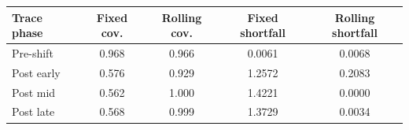 \begin{tabular}{lcccc}
\hline
Trace phase & Fixed cov. & Rolling cov. & Fixed shortfall & Rolling shortfall \\
\hline
Pre-shift & 0.968 & 0.966 & 0.0061 & 0.0068 \\
Post early & 0.576 & 0.929 & 1.2572 & 0.2083 \\
Post mid & 0.562 & 1.000 & 1.4221 & 0.0000 \\
Post late & 0.568 & 0.999 & 1.3729 & 0.0034 \\
\hline
\end{tabular}
